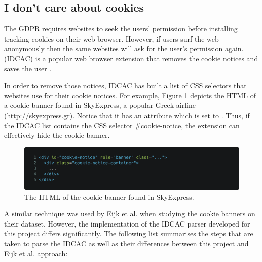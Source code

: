 \documentclass[../main.tex]{subfiles}
\begin{document}
\subsection{I don't care about cookies}

The GDPR requires websites to seek the users’ permission before installing tracking cookies on their web browser. However, if users surf the web anonymously then the same websites will ask for the user’s permission again.  (IDCAC) is a popular web browser extension that removes the cookie notices and saves the user . 

In order to remove those notices, IDCAC has built a list of CSS selectors that websites use for their cookie notices. For example, Figure \ref{fig:design_skyexpress} depicts the HTML of a cookie banner found in SkyExpress, a popular Greek airline (\url{http://skyexpress.gr}). Notice that it has an  attribute which is set to . Thus, if the IDCAC list contains the CSS selector {\selectfont \#cookie-notice}, the extension can effectively hide the cookie banner.

\begin{figure}[ht]
    \centering
    \includegraphics[width=\textwidth]{images/implementation/skyexpress.png}
    \caption{The HTML of the cookie banner found in SkyExpress.}
    \label{fig:design_skyexpress}
\end{figure}

A similar technique was used by Eijk et al. when studying the cookie banners on their dataset. However, the implementation of the IDCAC parser developed for this project differs significantly. The following list summarises the steps that are taken to parse the IDCAC as well as their differences between this project and Eijk et al. approach:
\end{document}

